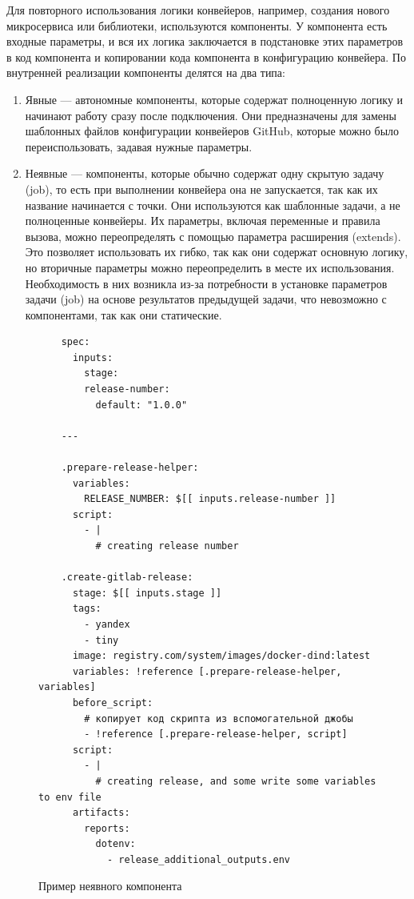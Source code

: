 Для повторного использования логики конвейеров, например, создания нового микросервиса или библиотеки, используются компоненты.
У компонента есть входные параметры, и вся их логика заключается в подстановке этих параметров в код компонента и копировании кода компонента в конфигурацию конвейера.
По внутренней реализации компоненты делятся на два типа:
\begin{enumerate}
  \item Явные — автономные компоненты, которые содержат полноценную логику и начинают работу сразу после подключения.
  Они предназначены для замены шаблонных файлов конфигурации конвейеров GitHub, которые можно было переиспользовать, задавая нужные параметры.
  \item Неявные — компоненты, которые обычно содержат одну скрытую задачу (job), то есть при выполнении конвейера она не запускается, так как их название начинается с точки.
  Они используются как шаблонные задачи, а не полноценные конвейеры.
  Их параметры, включая переменные и правила вызова, можно переопределять с помощью параметра расширения (extends).
  Это позволяет использовать их гибко, так как они содержат основную логику, но вторичные параметры можно переопределить в месте их использования.
  Необходимость в них возникла из-за потребности в установке параметров задачи (job) на основе результатов предыдущей задачи, что невозможно с компонентами, так как они статические.
\end{enumerate}

\begin{figure}
  \centering
  \scriptsize
  \begin{verbatim}
    spec:
      inputs:
        stage:
        release-number:
          default: "1.0.0"

    ---

    .prepare-release-helper:
      variables:
        RELEASE_NUMBER: $[[ inputs.release-number ]]
      script:
        - |
          # creating release number

    .create-gitlab-release:
      stage: $[[ inputs.stage ]]
      tags:
        - yandex
        - tiny
      image: registry.com/system/images/docker-dind:latest
      variables: !reference [.prepare-release-helper, variables]
      before_script:
        # копирует код скрипта из вспомогательной джобы
        - !reference [.prepare-release-helper, script]
      script:
        - |
          # creating release, and some write some variables to env file
      artifacts:
        reports:
          dotenv:
            - release_additional_outputs.env
  \end{verbatim}
  \caption{Пример неявного компонента}
  \label{fig:implicit-component-code}
\end{figure}

